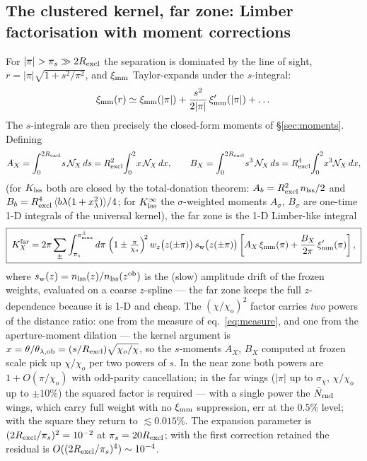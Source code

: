 \documentclass[a4paper, 11pt]{article}
\newcommand{\zob}{z^{\rm ob}}
\newcommand{\ximm}{\xi_{\rm mm}}
\newcommand{\avg}[1]{\langle #1 \rangle}
\newcommand{\Rex}{R_{\rm excl}}
\newcommand{\rp}{s}
\newcommand{\nlss}{n_{\rm lss}}
\newcommand{\Ncal}{\mathcal{N}}
\newcommand{\Nbar}{\bar{N}_{\rm rnd}}
\newcommand{\Klss}{K_{\rm lss}}
\newcommand{\KlssInf}{K_{\rm lss}^{\infty}}
\newcommand{\thob}{\theta_{\lambda,{\rm ob}}}
\begin{document}
\subsection{The clustered kernel, far zone: Limber factorisation with moment corrections}
\label{sec:far}

For $|\pi|>\pi_s \gg 2\Rex$ the separation is dominated by the
line of sight, $r = |\pi|\sqrt{1+\rp^2/\pi^2}$, and $\ximm$
Taylor-expands under the $\rp$-integral:
\begin{equation}
\ximm(r) \simeq \ximm(|\pi|) +
\frac{\rp^2}{2|\pi|}\,\ximm'(|\pi|) + \dots
\end{equation}
The $\rp$-integrals are then precisely the closed-form moments of
\S\ref{sec:moments}. Defining
\begin{equation}
A_X = \int_0^{2\Rex}\!\rp\, \Ncal_X\,d\rp
    = \Rex^2\!\int_0^2\! x\, \Ncal_X\,dx,
\qquad
B_X = \int_0^{2\Rex}\!\rp^3\, \Ncal_X\,d\rp
    = \Rex^4\!\int_0^2\! x^3 \Ncal_X\,dx,
\end{equation}
(for $\Klss$ both are closed by the total-donation theorem:
$A_b = \Rex^2\,\nlss/2$ and
$B_b = \Rex^4\,\avg{b\lambda(1+x_\lambda^2)}/4$; for $\KlssInf$
the $\sigma$-weighted moments $A_\sigma$, $B_\sigma$ are one-time
1-D integrals of the universal kernel), the far zone is the 1-D
Limber-like integral
\begin{equation}
\boxed{\;
K_X^{\rm far}
= 2\pi\sum_{\pm}\int_{\pi_s}^{\pi_{\max}^{\pm}} d\pi\;
\Big(1\pm\tfrac{\pi}{\chi_o}\Big)^{\!2}\, w_z\big(z(\pm\pi)\big)\,
s_{\rm w}\big(z(\pm\pi)\big)
\left[ A_X\,\ximm(\pi) + \frac{B_X}{2\pi}\,\ximm'(\pi)\right],
\;}
\label{eq:master_far}
\end{equation}
where $s_{\rm w}(z) = \nlss(z)/\nlss(\zob)$ is the (slow)
amplitude drift of the frozen weights, evaluated on a coarse
$z$-spline --- the far zone keeps the full $z$-dependence because
it is 1-D and cheap. The $(\chi/\chi_o)^2$ factor carries
\emph{two} powers of the distance ratio: one from the measure of
eq.~\eqref{eq:measure}, and one from the aperture-moment dilation
--- the kernel argument is $x = \theta/\thob =
(\rp/\Rex)\sqrt{\chi_o/\chi}$, so the $\rp$-moments $A_X$, $B_X$
computed at frozen scale pick up $\chi/\chi_o$ per two powers of
$\rp$. In the near zone both powers are $1+O(\pi/\chi_o)$ with
odd-parity cancellation; in the far wings ($|\pi|$ up to
$\sigma_\chi$, $\chi/\chi_o$ up to $\pm10\%$) the squared factor
is required --- with a single power the $\Nbar$ wings, which
carry full weight with no $\ximm$ suppression, err at the
$0.5\%$ level; with the square they return to $\lesssim0.015\%$.
The expansion parameter is $(2\Rex/\pi_s)^2 = 10^{-2}$ at
$\pi_s = 20\Rex$; with the first correction retained the residual
is $O((2\Rex/\pi_s)^4)\sim 10^{-4}$.
\end{document}
